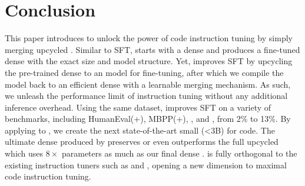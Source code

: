 \section{Conclusion}



This paper introduces \ours to unlock the power of code instruction tuning by simply merging upcycled \moe.
Similar to SFT, \ours starts with a dense \llm{} and produces a fine-tuned dense \llm{} with the exact size and model structure.
Yet, \ours improves SFT by upcycling the pre-trained dense \llm{} to an \moe{} model for fine-tuning, after which we compile the \moe{} model back to an efficient dense \llm{} with a learnable merging mechanism.
As such, we unleash the performance limit of instruction tuning without any additional inference overhead.
Using the same dataset, \ours improves SFT on a variety of benchmarks, including HumanEval(+), MBPP(+), \multiple{}, and \dsonek{}, from 2\% to 13\%.
By applying \ours to , we create the next state-of-the-art small (<3B) \llm{} for code.
The ultimate dense \llm{} produced by \ours preserves or even outperforms the full upcycled \moe which uses $8\times$ parameters as much as our final dense \llm{}.
\ours is fully orthogonal to the existing instruction tuners such as \evolinstruct{} and \ossinstruct{}, opening a new dimension to maximal code instruction tuning.

